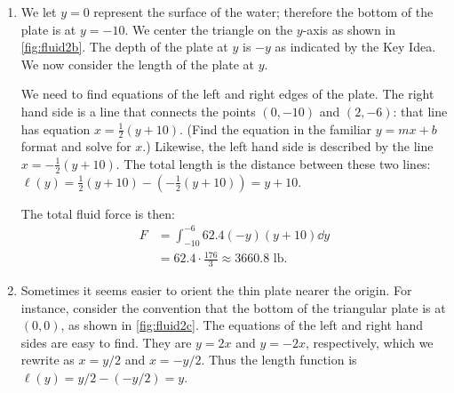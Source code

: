 \begin{example}
\begin{enumerate}
	\item	We let $y=0$ represent the surface of the water; therefore the bottom of the plate is at $y=-10$. We center the triangle on the $y$-axis as shown in \autoref{fig:fluid2b}. The depth of the plate at $y$ is $-y$ as indicated by the Key Idea. We now consider the length of the plate at $y$.

	We need to find equations of the left and right edges of the plate. The right hand side is a line that connects the points $(0,-10)$ and $(2,-6)$: that line has equation $x=\frac12(y+10)$. (Find the equation in the familiar $y=mx+b$ format and solve for $x$.) Likewise, the left hand side is described by the line $x=-\frac12(y+10)$. The total length is the distance between these two lines: $\ell(y)=\frac12(y+10) - (-\frac12(y+10)) = y+10.$
	
The total fluid force is then:
\begin{align*}
	F 	&=	\int_{-10}^{-6} 62.4(-y)(y+10)\dd y \\
		&=	62.4\cdot \frac{176}{3} \approx	3660.8\text{ lb}.
\end{align*}	

	\item	Sometimes it seems easier to orient the thin plate nearer the origin. For instance, consider the convention that the bottom of the triangular plate is at $(0,0)$, as shown in \autoref{fig:fluid2c}. The equations of the left and right hand sides are easy to find. They are $y=2x$ and $y=-2x$, respectively, which we rewrite as $x=y/2$ and $x=-y/2$. Thus the length function is $\ell(y) =y/2-(-y/2) = y$. 


\end{enumerate}
\end{example}
